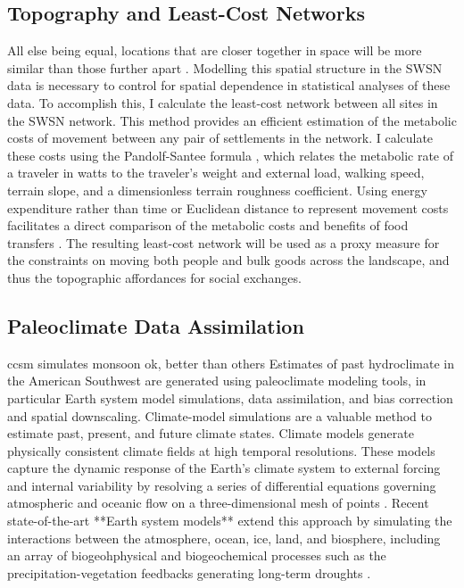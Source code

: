 \documentclass[fleqn,10pt]{wlscirep}
\begin{document}
\subsection*{Topography and Least-Cost Networks}
All else being equal, locations that are closer together in space will be more similar than those further apart \cite{Tobler1970}. Modelling this spatial structure in the SWSN data is necessary to control for spatial dependence in statistical analyses of these data. To accomplish this, I calculate the least-cost network between all sites in the SWSN network. This method provides an efficient estimation of the metabolic costs of movement between any pair of settlements in the network. I calculate these costs using the Pandolf-Santee formula \cite{White2012}, which relates the metabolic rate of a traveler in watts to the traveler's weight and external load, walking speed, terrain slope, and a dimensionless terrain roughness coefficient. Using energy expenditure rather than time or Euclidean distance to represent movement costs facilitates a direct comparison of the metabolic costs and benefits of food transfers  \cite{Drennan1984}. The resulting least-cost network will be used as a proxy measure for the constraints on moving both people and bulk goods across the landscape, and thus the topographic affordances for social exchanges.

\subsection*{Paleoclimate Data Assimilation}
ccsm simulates monsoon ok, better than others
Estimates of past hydroclimate in the American Southwest are generated using paleoclimate modeling tools, in particular Earth system model simulations, data assimilation, and bias correction and spatial downscaling. Climate-model simulations are a valuable method to estimate past, present, and future climate states. Climate models generate physically consistent climate fields at high temporal resolutions. These models capture the dynamic response of the Earth’s climate system to external forcing and internal variability by resolving a series of differential equations governing atmospheric and oceanic flow on a three-dimensional mesh of points \cite{Gettelman}. Recent state-of-the-art **Earth system models** extend this approach by simulating the interactions between the atmosphere, ocean, ice, land, and biosphere, including an array of biogeohphysical and biogeochemical processes such as the precipitation-vegetation feedbacks generating long-term droughts \cite{Hurrell2013,Kay2015,Gettelman}.
\end{document}
